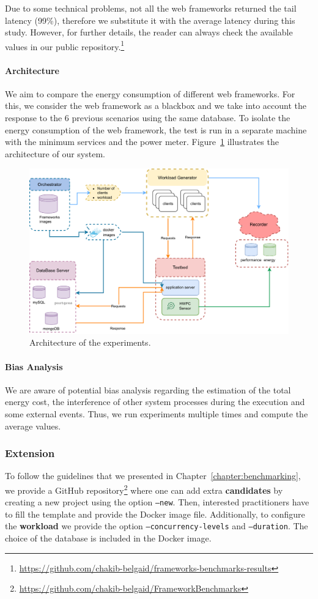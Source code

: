 Due to some technical problems, not all the web frameworks returned the tail latency (99\%), therefore we substitute it with the average latency during this study.
However, for further details, the reader can always check the available values in our public repository.\footnote{\url{https://github.com/chakib-belgaid/frameworks-benchmarks-results}}


\paragraph{Architecture}
We aim to compare the energy consumption of different web frameworks.
For this, we consider the web framework as a blackbox and we take into account the response to the 6 previous scenarios using the same database.
To isolate the energy consumption of the web framework, the test is run in a separate machine with the minimum services and the power meter.
Figure~\ref{fig:architecture} illustrates the architecture of our system.

\begin{figure}[bht]
    \centering
    \includegraphics[width=.8\columnwidth]{imgs/architecture}
    \caption[Architecture]{Architecture of the experiments.}
    \label{fig:architecture}
\end{figure}


\paragraph{Bias Analysis}
We are aware of potential bias analysis regarding the estimation of the total energy cost, the interference of other system processes during the execution and some external events.
Thus, we run experiments multiple times and compute the average values.

\subsubsection{Extension}
To follow the guidelines that we presented in Chapter~\ref{chapter:benchmarking}, we provide a GitHub repository\footnote{\url{https://github.com/chakib-belgaid/FrameworkBenchmarks}} where one can add extra \textbf{candidates} by creating a new project using the option \texttt{--new}.
Then, interested practitioners have to fill the template and provide the Docker image file.
Additionally, to configure the \textbf{workload} we provide the option \texttt{--concurrency-levels} and \texttt{--duration}.
The choice of the database is included in the Docker image.

